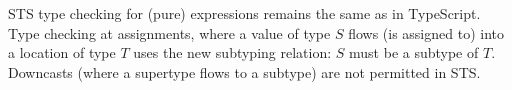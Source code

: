STS type checking for (pure) expressions remains the same as in TypeScript.
Type checking at assignments, where a value of type $S$ flows (is assigned to) 
into a location of type $T$ uses the new subtyping relation: $S$
must be a subtype of $T$.  Downcasts (where a supertype flows to a subtype)
are not permitted in STS.
